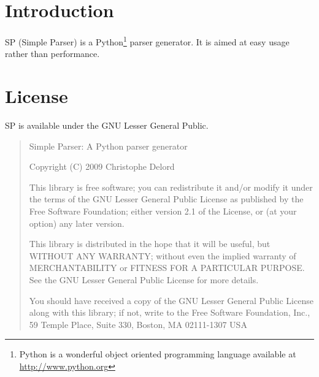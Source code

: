 %
%
%

\section{Introduction}

SP (Simple Parser) is a Python\footnote{Python is a wonderful object oriented programming language available at \url{http://www.python.org}} parser generator.
It is aimed at easy usage rather than performance.

\section{License}

SP is available under the GNU Lesser General Public.

\begin{quote}
Simple Parser: A Python parser generator

Copyright (C) 2009 Christophe Delord
 
This library is free software; you can redistribute it and/or
modify it under the terms of the GNU Lesser General Public
License as published by the Free Software Foundation; either
version 2.1 of the License, or (at your option) any later version.

This library is distributed in the hope that it will be useful,
but WITHOUT ANY WARRANTY; without even the implied warranty of
MERCHANTABILITY or FITNESS FOR A PARTICULAR PURPOSE.  See the GNU
Lesser General Public License for more details.

You should have received a copy of the GNU Lesser General Public
License along with this library; if not, write to the Free Software
Foundation, Inc., 59 Temple Place, Suite 330, Boston, MA  02111-1307  USA 
\end{quote}

